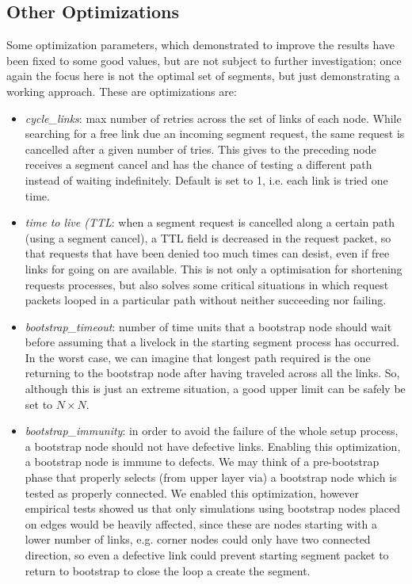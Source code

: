 \subsection{Other Optimizations}
Some optimization parameters, which demonstrated to improve the \disr{}
results have been fixed to some good values, but are not subject to
further investigation; once again the focus here is not the
optimal set of segments, but just demonstrating a working approach. 
These are optimizations are:
\begin{itemize}
\item \emph{cycle\_links}: max number of retries across the set of links of
each node. While searching for a free link due an incoming segment request,
the same request is cancelled after a given number of tries. This
gives to the preceding node receives a segment cancel and has the
chance of testing a different path instead of waiting indefinitely.
Default is set to 1, i.e. each link is tried one time.
\item \emph{time to live (TTL}: when a segment request is cancelled
along a certain path (using a segment cancel), a TTL field is
decreased in the request packet, so that requests that have been
denied too much times can desist, even if free links for going on are
available. This is not only a optimisation for shortening 
requests processes, but also solves some critical situations in which
request packets looped in a particular path without neither succeeding
nor failing.
\item \emph{bootstrap\_timeout}: number of time units that a bootstrap node
should wait before assuming that a livelock in the starting segment
process has occurred. In the worst case, we can imagine that longest
path required is the one returning to the bootstrap node after having
traveled across all the links. So, although this is just an extreme
situation, a good upper limit can be safely be set to $N \times N$.
\item \emph{bootstrap\_immunity}: in order to avoid the failure of the whole \disr{}
setup process, a bootstrap node should not have defective links.
Enabling this optimization, a bootstrap node is immune to defects.
We may think of a pre-bootstrap phase that properly selects (from upper
layer via) a bootstrap node which is tested as properly connected. We
enabled this optimization, however empirical tests showed us that only
simulations using bootstrap nodes placed on edges would be heavily
affected, since these are nodes starting with a lower number of links,
e.g. corner nodes could only have two connected direction, so even a
defective link could prevent starting segment packet to return to
bootstrap to close the loop a create the segment.
\end{itemize}
